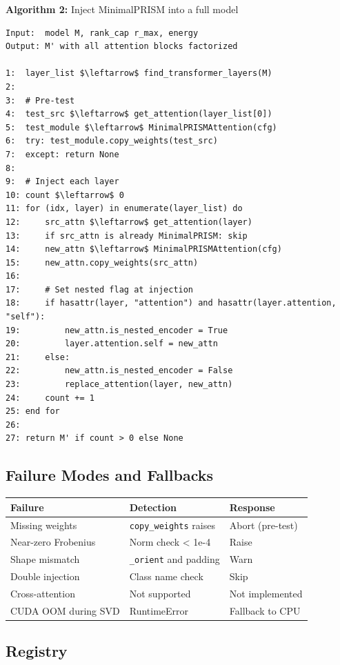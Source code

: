 \textbf{Algorithm 2:} Inject MinimalPRISM into a full model
\begin{lstlisting}
Input:  model M, rank_cap r_max, energy  
Output: M' with all attention blocks factorized

1:  layer_list $\leftarrow$ find_transformer_layers(M)
2:
3:  # Pre-test
4:  test_src $\leftarrow$ get_attention(layer_list[0])
5:  test_module $\leftarrow$ MinimalPRISMAttention(cfg)
6:  try: test_module.copy_weights(test_src)
7:  except: return None
8:
9:  # Inject each layer
10: count $\leftarrow$ 0
11: for (idx, layer) in enumerate(layer_list) do
12:     src_attn $\leftarrow$ get_attention(layer)
13:     if src_attn is already MinimalPRISM: skip
14:     new_attn $\leftarrow$ MinimalPRISMAttention(cfg)
15:     new_attn.copy_weights(src_attn)
16:
17:     # Set nested flag at injection
18:     if hasattr(layer, "attention") and hasattr(layer.attention, "self"):
19:         new_attn.is_nested_encoder = True
20:         layer.attention.self = new_attn
21:     else:
22:         new_attn.is_nested_encoder = False
23:         replace_attention(layer, new_attn)
24:     count += 1
25: end for
26:
27: return M' if count > 0 else None
\end{lstlisting}

\subsection{Failure Modes and Fallbacks}

\begin{table}[H]
\centering
\small
\begin{tabular}{lll}
\toprule
\textbf{Failure} & \textbf{Detection} & \textbf{Response} \\
\midrule
Missing weights & \texttt{copy\_weights} raises & Abort (pre-test) \\
Near-zero Frobenius & Norm check < 1e-4 & Raise \\
Shape mismatch & \texttt{\_orient} and padding & Warn \\
Double injection & Class name check & Skip \\
Cross-attention & Not supported & Not implemented \\
CUDA OOM during SVD & RuntimeError & Fallback to CPU \\
\bottomrule
\end{tabular}
\end{table}

\subsection{Registry}

